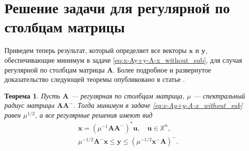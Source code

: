\documentclass[specialist,
               substylefile = spbu.rtx,
               subf,href,colorlinks=true, 12pt]{disser}
\newtheorem{theorem}{Теорема}
\theoremstyle{definition}
\begin{document}
\section{Решение задачи для регулярной по столбцам матрицы}\label{sec:SRM}

Приведем теперь результат, который определяет все векторы $\bm{x}$ и $\bm{y}$, обеспечивающие минимум в задаче \eqref{eq:x-Ay+y-A-x_without_sub}, для случая регулярной по столбцам матрицы $\bm{A}$.
Более подробное и развернутое доказательство следующей теоремы опубликовано в статье \cite{Krivulin2019OnRankone}.
\begin{theorem}
\label{th:without_sub_regular}
Пусть $\bm{A}$ --- регулярная по столбцам матрица, $\mu$ --- спектральный радиус матрицы $\bm{A}\bm{A}^{-}$. 
Тогда минимум в задаче \eqref{eq:x-Ay+y-A-x_without_sub} равен $\mu^{1/2}$, а все регулярные решения имеют вид
\begin{gather*}
\bm{x}=(\mu^{-1}\bm{A}\bm{A}^{-})^{\ast}\bm{u},
\quad
\bm{u}\in\mathbb{X}^{n},
\\
\mu^{-1/2}\bm{A}^{-}\bm{x}
\leq
\bm{y}
\leq
(\mu^{-1/2}\bm{x}^{-}\bm{A})^{-}.
\end{gather*}
\end{theorem}
\end{document}
